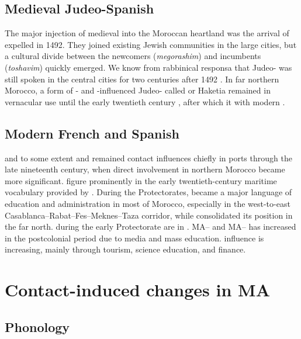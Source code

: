 \documentclass[output=paper]{langsci/langscibook}
\begin{document}
\subsection{Medieval Judeo-Spanish}

The major injection of medieval  into the Moroccan heartland was the arrival of expelled   in 1492. They joined existing Jewish communities in the large cities, but a cultural divide between the newcomers (\textit{megorashim}) and incumbents (\textit{toshavim}) quickly emerged. We know from rabbinical responsa that Judeo- was still spoken in the central cities for two centuries after 1492 \citep{Chetrit1985}. In far northern Morocco, a form of - and -influenced Judeo- called  or Haketia remained in vernacular use until the early twentieth century \citep{Benoliel1977}, after which it  with modern .

\subsection{Modern French and Spanish}

 and to some extent  and  remained contact influences chiefly in ports through the late nineteenth century, when direct  involvement in northern Morocco became more significant.   figure prominently in the early twentieth-century maritime vocabulary provided by \citet{Brunot1920}. During the Protectorates,  became a major language of education and administration in most of Morocco, especially in the west-to-east Casablanca–Rabat–Fes–Meknes–Taza corridor, while  consolidated its position in the far north.   during the early Protectorate are in \citet{Brunot1949}. MA– and MA–  has increased in the postcolonial period due to media and mass education.  influence is increasing, mainly through tourism, science education, and finance.

\section{Contact-induced changes in MA}

\subsection{Phonology}
\end{document}
